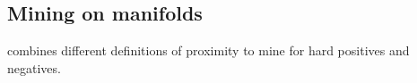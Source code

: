 \subsection{Mining on manifolds}\label{subsec:mining_manifolds}

\citet{mining_manifolds_2018} combines different definitions of proximity to mine 
for hard positives and negatives.
